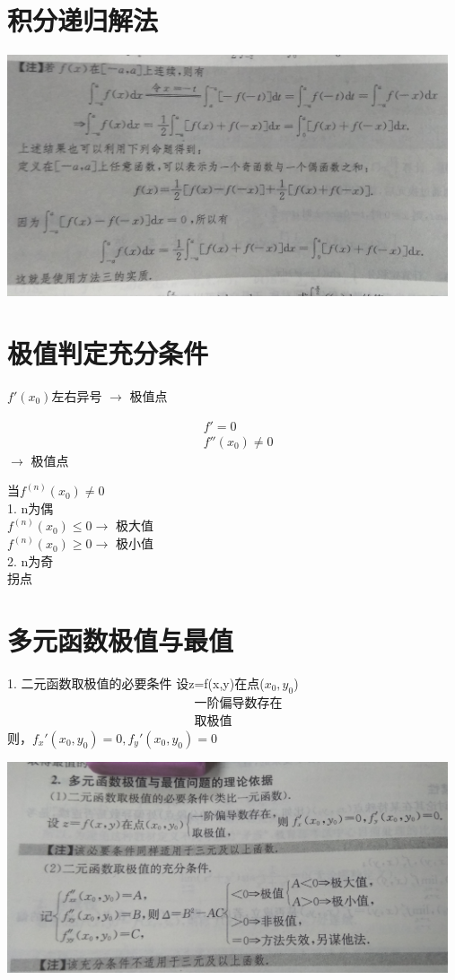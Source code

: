 \documentclass[UTF8]{ctexart}
\begin{document}
\section{积分递归解法}
\includegraphics[width=13cm]{9345E7/2002379869.jpg}

\section{极值判定充分条件}
$f '(x_0)$左右异号 $\rightarrow$ 极值点

\begin{align}
&f'=0 \\
&f''(x_0) \neq 0
\end{align}
$\rightarrow$ 极值点

当$ f^{(n)} (x_0) \neq 0$ \\
1. n为偶   \\
    $f^{(n)} (x_0) \leq 0 \rightarrow $ 极大值  \\
    $f^{(n)} (x_0) \geq 0 \rightarrow $ 极小值  \\
    2. n为奇  \\
        拐点  \\

\section{多元函数极值与最值}
1. 二元函数取极值的必要条件
设z=f(x,y)在点($x_0,y_0$) \\
\begin{align}
&\mbox{一阶偏导数存在}\\
&\mbox{取极值}
\end{align}则，$ f_x' (x_0 , y_0)=0 , f_y' (x_0 , y_0)=0 $

\includegraphics[width=13cm]{9345E7/2805530637.jpg}
\end{document}
